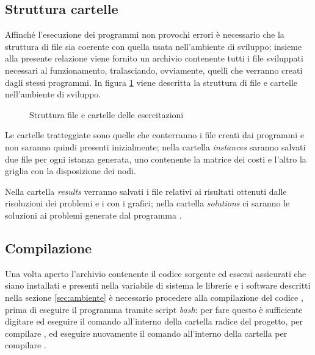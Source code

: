 \subsection{Struttura cartelle}
Affinché l'esecuzione dei programmi non provochi errori è necessario che la struttura di file sia coerente con quella usata nell'ambiente di sviluppo; insieme alla presente relazione viene fornito un archivio contenente tutti i file sviluppati necessari al funzionamento, tralasciando, ovviamente, quelli che verranno creati dagli stessi programmi.
In figura \ref{fig:struttura} viene descritta la struttura di file e cartelle nell'ambiente di sviluppo.

\begin{figure}[htb]
\centering

\caption{Struttura file e cartelle delle esercitazioni}
\label{fig:struttura}
\end{figure}

Le cartelle tratteggiate sono quelle che conterranno i file creati dai programmi e non saranno quindi presenti inizialmente; nella cartella \emph{instances} saranno salvati due file per ogni istanza generata, uno contenente la matrice dei costi e l'altro la griglia con la disposizione dei nodi.

Nella cartella \emph{results} verranno salvati i file relativi ai risultati ottenuti dalle risoluzioni dei problemi e i  con i grafici; nella cartella \emph{solutions} ci saranno le soluzioni ai problemi generate dal programma .

\subsection{Compilazione}
Una volta aperto l'archivio contenente il codice sorgente ed essersi assicurati che siano installati e presenti nella variabile di sistema  le librerie e i software descritti nella sezione \ref{sec:ambiente} è necessario procedere alla compilazione del codice , prima di eseguire il programma tramite script \emph{bash}: per fare questo è sufficiente digitare ed eseguire il comando  all'interno della cartella radice del progetto, per compilare , ed eseguire nuovamente il comando  all'interno della cartella  per compilare .

